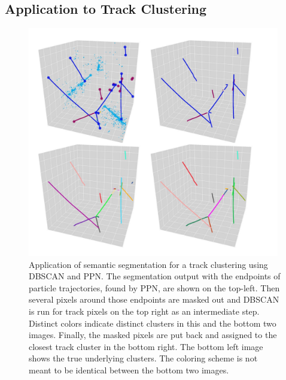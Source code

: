 \documentclass{ws-rv9x6}
\begin{document}
\subsection{Application to Track Clustering}
\begin{figure}[t]
    \centering
    \includegraphics[width=0.98\textwidth]{figures/track_clustering.pdf}
    \caption{Application of semantic segmentation for a track clustering  using DBSCAN and PPN. The segmentation output with the endpoints of particle trajectories, found by PPN, are shown on the top-left. Then several pixels around those endpoints are masked out and DBSCAN is run for track pixels on the top right as an intermediate step. Distinct colors indicate distinct clusters in this and the bottom two images. Finally, the masked pixels are put back and assigned to the closest track cluster in the bottom right. The bottom left image shows the true underlying clusters. The coloring scheme is not meant to be identical between the bottom two images.}
    \label{fig:clustering:ppn_track_clustering}
\end{figure}
\end{document}

